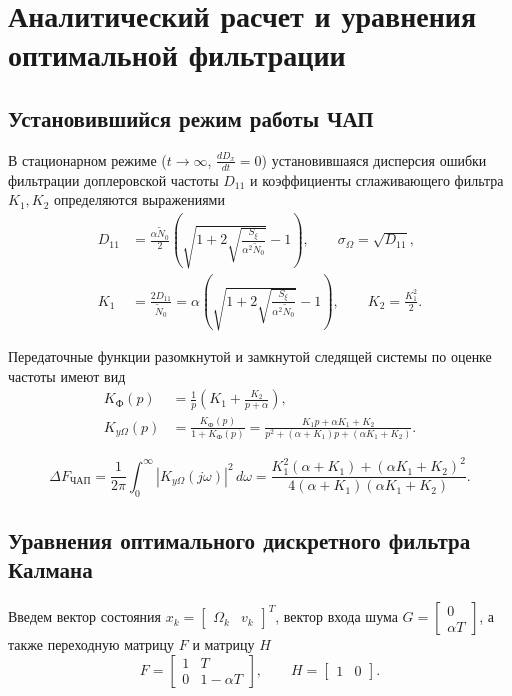 \section{Аналитический расчет и уравнения оптимальной фильтрации}

\subsection{Установившийся режим работы ЧАП}
В стационарном режиме ($t \to \infty$, $\frac{d D_x}{dt} = 0$) установившаяся дисперсия ошибки фильтрации доплеровской частоты $D_{11}$ и коэффициенты сглаживающего фильтра $K_1, K_2$ определяются выражениями
\begin{align}
D_{11} &= \frac{\alpha \tilde{N}_0}{2} \left(\sqrt{1 + 2\sqrt{\frac{S_\xi}{\alpha^2 \tilde{N}_0}}} - 1\right), \qquad \sigma_\Omega = \sqrt{D_{11}}, \\
K_1 &= \frac{2 D_{11}}{\tilde{N}_0} = \alpha \left(\sqrt{1 + 2\sqrt{\frac{S_\xi}{\alpha^2 \tilde{N}_0}}} - 1\right), \qquad K_2 = \frac{K_1^2}{2}.
\end{align}

Передаточные функции разомкнутой и замкнутой следящей системы по оценке частоты имеют вид
\begin{align}
K_{\text{Ф}}(p) &= \frac{1}{p}\left(K_1 + \frac{K_2}{p + \alpha}\right), \\
K_{y\Omega}(p) &= \frac{K_{\text{Ф}}(p)}{1 + K_{\text{Ф}}(p)} = \frac{K_1 p + \alpha K_1 + K_2}{p^2 + (\alpha + K_1)p + (\alpha K_1 + K_2)}.
\end{align}

\begin{equation}
\Delta F_{\text{ЧАП}} = \frac{1}{2\pi} \int_0^\infty |K_{y\Omega}(j\omega)|^2 \, d\omega = \frac{K_1^2(\alpha + K_1) + (\alpha K_1 + K_2)^2}{4(\alpha + K_1)(\alpha K_1 + K_2)}.
\end{equation}

\subsection{Уравнения оптимального дискретного фильтра Калмана}
Введем вектор состояния $x_k = \begin{bmatrix} \Omega_k & v_k \end{bmatrix}^T$, вектор входа шума $G = \begin{bmatrix} 0 \\ \alpha T \end{bmatrix}$, а также переходную матрицу $F$ и матрицу $H$
\begin{equation}
F = \begin{bmatrix} 1 & T \\ 0 & 1 - \alpha T \end{bmatrix}, \qquad H = \begin{bmatrix} 1 & 0 \end{bmatrix}.
\end{equation}

